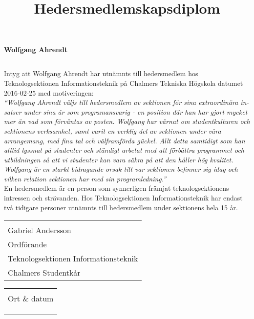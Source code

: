 \documentclass[11pt, noincludeaddress, nopagination]{classes/cthit}
\makeatletter
\newcommand{\sign}[4]{%
  \begin{tabular}[t]{@{}l@{}}
  \makebox[6.5cm]{\dotfill}\\
  \strut#1\strut \\
  \strut#2\strut \\
  \strut#3\strut \\
  \strut#4\strut \\
  \end{tabular}%
}
\makeatother
\begin{document}
\title{Hedersmedlemskapsdiplom}

\makeheadfoot%

\makesimpletitle
\begin{center}
\textbf{\Huge{Wolfgang Ahrendt}}
\end{center}
\vspace{1cm}
\subsection*{}
Intyg att Wolfgang Ahrendt har utnämnts till hedersmedlem hos Teknologsektionen Informationsteknik på Chalmers Tekniska Högskola datumet 2016-02-25 med motiveringen: 
\\
\textit{
``Wolfgang Ahrendt väljs till hedersmedlem av sektionen för sina extraordinära in-
satser under sina år som programansvarig - en position där han har gjort mycket mer än vad som förväntas av posten. Wolfgang har värnat om studentkulturen och sektionens verksamhet, samt varit en verklig del av sektionen under våra arrangemang, med fina tal och välframförda gückel. Allt detta samtidigt som han alltid lyssnat på studenter och ständigt arbetat med att förbättra programmet och utbildningen så att vi studenter kan vara säkra på att den håller hög kvalitet. Wolfgang är en starkt bidragande orsak till var sektionen befinner sig idag och vilken relation sektionen har med sin programledning.''
}
\\
En hedersmedlem är en person som synnerligen främjat teknologsektionens intressen och strävanden. Hos Teknologsektionen Informationsteknik har endast två tidigare personer utnämnts till hedersmedlem under sektionens hela 15 år.

\vspace{4cm} 

\noindent
  \begin{minipage}[t]{0.5\linewidth}
    \raggedright
    \sign{Gabriel Andersson}{Ordförande}{Teknologsektionen Informationsteknik}{Chalmers Studentkår}
  \end{minipage}%
  \hfill
  \begin{minipage}[t]{0.5\linewidth}
  \sign{Ort \& datum}{}{}{}
  \end{minipage}
\end{document}
